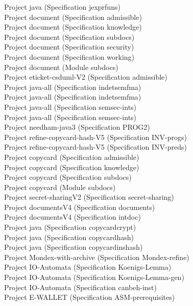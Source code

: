 \documentclass[a4paper]{article}
\begin{document}
\begin{itemize}
Project java (Specification jexprfuns) \\
Project document (Specification admissible) \\
Project document (Specification knowledge) \\
Project document (Specification subdocs) \\
Project document (Specification security) \\
Project document (Specification working) \\
Project document (Module subdocs) \\
Project eticket-csduml-V2 (Specification admissible) \\
Project java-all (Specification indetsemfma) \\
Project java-all (Specification indetsemfma) \\
Project java-all (Specification semsec-ints) \\
Project java-all (Specification semsec-ints) \\
Project needham-java3 (Specification PROG2) \\
Project refine-copycard-hash-V5 (Specification INV-progs) \\
Project refine-copycard-hash-V5 (Specification INV-preds) \\
Project copycard (Specification admissible) \\
Project copycard (Specification knowledge) \\
Project copycard (Specification subdocs) \\
Project copycard (Module subdocs) \\
Project secret-sharingV2 (Specification secret-sharing) \\
Project documentsV4 (Specification documents) \\
Project documentsV4 (Specification intdoc) \\
Project java (Specification copycardcrypt) \\
Project java (Specification copycardhash) \\
Project java (Specification copycardinshash) \\
Project Mondex-with-archive (Specification Mondex-refine) \\
Project IO-Automata (Specification Koenigs-Lemma) \\
Project IO-Automata (Specification Koenigs-Lemma-gen) \\
Project IO-Automata (Specification canbeh-inst) \\
Project E-WALLET (Specification ASM-prerequisites) \\

\end{itemize}
\end{document}
